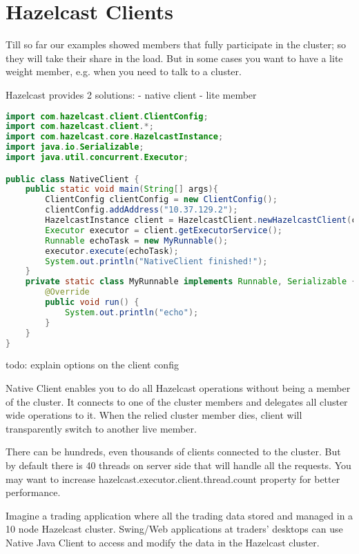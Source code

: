 \chapter{Hazelcast Clients}

Till so far our examples showed members that fully participate in the cluster; so they will take their share in the load. But in some cases you want to have a lite weight member, e.g. when you need to talk to a cluster.

Hazelcast provides 2 solutions:
- native client
- lite member

\begin{lstlisting}[language=java]
import com.hazelcast.client.ClientConfig;
import com.hazelcast.client.*;
import com.hazelcast.core.HazelcastInstance;
import java.io.Serializable;
import java.util.concurrent.Executor;

public class NativeClient {
    public static void main(String[] args){
        ClientConfig clientConfig = new ClientConfig();
        clientConfig.addAddress("10.37.129.2");
        HazelcastInstance client = HazelcastClient.newHazelcastClient(clientConfig);
        Executor executor = client.getExecutorService();
        Runnable echoTask = new MyRunnable();
        executor.execute(echoTask);
        System.out.println("NativeClient finished!");
    }
    private static class MyRunnable implements Runnable, Serializable {
        @Override
        public void run() {
            System.out.println("echo");
        }
    }
}
\end{lstlisting}

todo: explain options on the client config



Native Client enables you to do all Hazelcast operations without being a member of the cluster. It connects to one of the cluster members and delegates all cluster wide operations to it. When the relied cluster member dies, client will transparently switch to another live member.

There can be hundreds, even thousands of clients connected to the cluster. But by default there is 40 threads on server side that will handle all the requests. You may want to increase hazelcast.executor.client.thread.count property for better performance.

Imagine a trading application where all the trading data stored and managed in a 10 node Hazelcast cluster. Swing/Web applications at traders' desktops can use Native Java Client to access and modify the data in the Hazelcast cluster.

